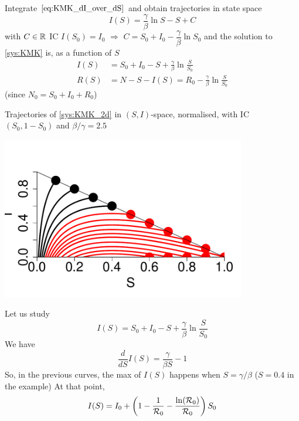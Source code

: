 \documentclass[aspectratio=169]{beamer}\usepackage[]{graphicx}\usepackage[]{xcolor}
\begin{document}
\begin{frame}{}
  Integrate $\eqref{eq:KMK_dI_over_dS}$ and obtain trajectories in state space
  $$
  I(S)=\frac\gamma\beta \ln S-S+C
  $$
  with $C\in\mathbb{R}$
  \vfill
  IC $I(S_0)=I_0$ $\Rightarrow$ $C=S_0+I_0-\dfrac \gamma\beta \ln S_0$ and the solution to \eqref{sys:KMK} is, as a function of $S$
  \begin{align*}
  I(S)&=S_0+I_0-S+\frac\gamma\beta \ln \frac S{S_0} \\
  R(S)&=N-S-I(S)=R_0-\frac\gamma\beta \ln \frac S{S_0}
  \end{align*}
  (since $N_0=S_0+I_0+R_0$)
\end{frame}




\begin{frame}
Trajectories of \eqref{sys:KMK_2d} in $(S,I)$-space, normalised, with IC $(S_0,1-S_0)$ and $\beta/\gamma=2.5$
\vfill
\begin{center}
\includegraphics[width=0.8\textwidth]{FIGS/course-01-KMK_SI_plane-1.pdf}
\end{center}
\end{frame}



\begin{frame}{}
  Let us study
  $$
  I(S)=S_0+I_0-S+\frac\gamma\beta \ln \frac S{S_0} 
  $$
  We have
  $$
  \frac{d}{dS}I(S) = \frac{\gamma}{\beta S}-1
  $$
  So, in the previous curves, the max of $I(S)$ happens when $S=\gamma/\beta$ ($S=0.4$ in the example)
  \vfill
  At that point,
  $$
  I(S) = I_0+\left(
    1-\frac{1}{\mathcal{R}_0} - \frac{\ln(\mathcal{R}_0)}{\mathcal{R}_0}
  \right)S_0
  $$
\end{frame}
\end{document}
